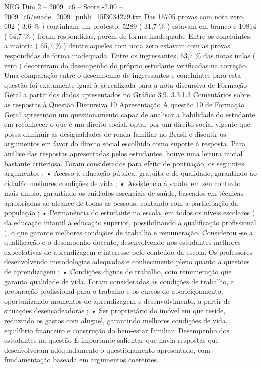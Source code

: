 \begin{textsample}{NEG Dim 2 – 2009\_c6 – Score -2.00 – 2009\_c6/enade\_2009\_publi\_15f3034279.txt}
Das 16705 provas com nota zero, 602 ( 3,6 \% ) continham um protesto, 5289 ( 31,7 \% ) estavam em branco e 10814 ( 64,7 \% ) foram respondidas, porém de forma inadequada.
Entre os concluintes, a maioria ( 65,7 \% ) dentre aqueles com nota zero estavam com as provas respondidas de forma inadequada.
Entre os ingressantes, 63,7 \% das notas nulas ( zero ) decorreram do desempenho do próprio estudante verificadas na correção.
Uma comparação entre o desempenho de ingressantes e concluintes para esta questão foi exatamente igual à já realizada para a nota discursiva de Formação Geral a partir dos dados apresentados no Gráfico 3.9. 3.3.1.3 Comentários sobre as respostas à Questão Discursiva 10 Apresentação A questão 10 de Formação Geral apresentou um questionamento capaz de analisar a habilidade do estudante em reconhecer o que é um direito social, optar por um direito social vigente que possa diminuir as desigualdades de renda familiar no Brasil e discutir os argumentos em favor do direito social escolhido como suporte à resposta.
Para análise das respostas apresentadas pelos estudantes, houve uma leitura inicial bastante criteriosa.
Foram considerados para efeito de pontuação, os seguintes argumentos : • Acesso à educação pública, gratuita e de qualidade, garantindo ao cidadão melhores condições de vida ; • Assistência à saúde, em seu contexto mais amplo, garantindo os cuidados essenciais de saúde, baseados em técnicas apropriadas ao alcance de todas as pessoas, contando com a participação da população ; • Permanência do estudante na escola, em todos os níveis escolares ( da educação infantil à educação superior, possibilitando a qualificação profissional ), o que garante melhores condições de trabalho e remuneração.
Considerou -se a qualificação e o desempenho docente, desenvolvendo nos estudantes melhores expectativas de aprendizagem e interesse pelo conteúdo da escola.
Os professores desenvolvendo metodologias adequadas e conhecimento pleno quanto a questões de aprendizagem ; • Condições dignas de trabalho, com remuneração que garanta qualidade de vida.
Foram consideradas as condições de trabalho, a preparação profissional para o trabalho e os cursos de aperfeiçoamento, oportunizando momentos de aprendizagem e desenvolvimento, a partir de situações desencadeadoras ; • Ser proprietário do imóvel em que reside, reduzindo os gastos com aluguel, garantindo melhores condições de vida, equilíbrio financeiro e construção do bem-estar familiar.
Desempenho dos estudantes na questão É importante salientar que havia respostas que desenvolveram adequadamente o questionamento apresentado, com fundamentação baseada em argumentos coerentes.

\end{textsample}
